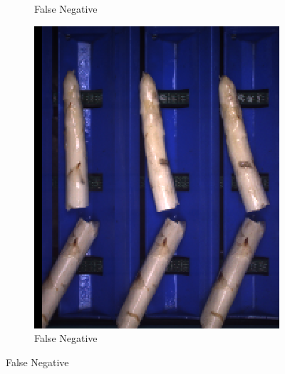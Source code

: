 \begin{figure}[h]
\begin{subfigure}{0.3\textwidth}
		\vspace{-5pt}
		\caption{False Negative}
	\end{subfigure}
	\begin{subfigure}{0.3\textwidth}
		\includegraphics[width=0.9\linewidth]{Figures/appendix/notclassifiable_falsenegative_03.png}
		\vspace{-5pt}
		\caption{False Negative}
	\end{subfigure}


\end{figure}
